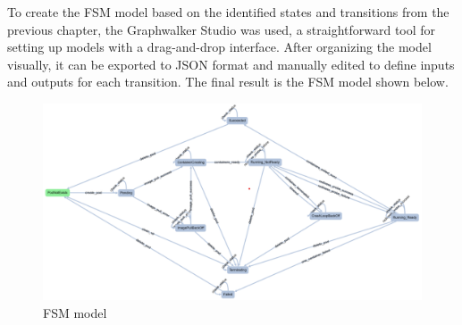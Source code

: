 \documentclass[main.tex]{subfiles}
\begin{document}
To create the FSM model based on the identified states and transitions from the previous chapter, the Graphwalker Studio was used, a straightforward tool for setting up models with a drag-and-drop interface. After organizing the model visually, it can be exported to JSON format and manually edited to define inputs and outputs for each transition. The final result is the FSM model shown below.
\begin{figure}[H]
    \centering
    \includegraphics[width=\textwidth]{k8s_fsm_model.png}
    \caption{FSM model}
    \label{fig:fsm_model}
\end{figure}
\end{document}
